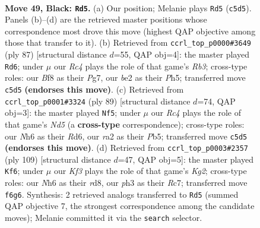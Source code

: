 \documentclass[11pt]{article}
\begin{document}
\clearpage

\begin{figure}[p]\centering
\begin{subfigure}{0.46\textwidth}\centering
\resizebox{\linewidth}{!}{%
\newchessgame
\chessboard[
  setfen={5b1r/p6p/P4k1n/2r5/8/1Pp3BP/R1P1B1PK/2R5 b - - 6 49},
  showmover=false,
  pgfstyle=straightmove, color=movearrow, markmove={c5-d5}
]}
\caption{}
\end{subfigure}\hfill
\begin{subfigure}{0.46\textwidth}\centering
\resizebox{\linewidth}{!}{%
\newchessgame
\chessboard[
  setfen={5k2/6p1/pr6/1p1B1p1p/3P4/bP4P1/P1R2PK1/8 b - - 1 44},
  showmover=false,
  pgfstyle=straightmove, color=movearrow, markmove={b6-d6}
]}
\caption{}
\end{subfigure}
\\[4pt]
\begin{subfigure}{0.46\textwidth}\centering
\resizebox{\linewidth}{!}{%
\newchessgame
\chessboard[
  setfen={5k2/6b1/p2r4/1p6/3n1P1P/P5PK/BP4R1/8 b - - 4 45},
  showmover=false,
  pgfstyle=straightmove, color=movearrow, markmove={d4-f5}
]}
\caption{}
\end{subfigure}\hfill
\begin{subfigure}{0.46\textwidth}\centering
\resizebox{\linewidth}{!}{%
\newchessgame
\chessboard[
  setfen={3R4/2r1p1k1/6p1/2n4p/p1P2P1P/5KP1/P1R1B3/1r6 b - - 32 55},
  showmover=false,
  pgfstyle=straightmove, color=movearrow, markmove={g7-f6}
]}
\caption{}
\end{subfigure}
\caption{\textbf{Move 49, Black: \texttt{Rd5}.} (a) Our position; Melanie plays \texttt{Rd5} (\texttt{c5d5}). Panels (b)--(d) are the retrieved master positions whose correspondence most drove this move (highest QAP objective among those that transfer to it). (b) Retrieved from \texttt{ccrl\_top\_p0000\#3649} (ply 87) [structural distance $d$=55, QAP obj=4]: the master played \texttt{Rd6}; under $\mu$ our \emph{Rc4} plays the role of that game's \emph{Rb3}; cross-type roles: our \emph{B}f8 as their \emph{P}g7, our \emph{b}e2 as their \emph{P}h5; transferred move \texttt{c5d5} \textbf{(endorses this move)}. (c) Retrieved from \texttt{ccrl\_top\_p0001\#3324} (ply 89) [structural distance $d$=74, QAP obj=3]: the master played \texttt{Nf5}; under $\mu$ our \emph{Rc4} plays the role of that game's \emph{Nd5} (a \textbf{cross-type} correspondence); cross-type roles: our \emph{N}h6 as their \emph{R}d6, our \emph{r}a2 as their \emph{P}b5; transferred move \texttt{c5d5} \textbf{(endorses this move)}. (d) Retrieved from \texttt{ccrl\_top\_p0003\#2357} (ply 109) [structural distance $d$=47, QAP obj=5]: the master played \texttt{Kf6}; under $\mu$ our \emph{Kf3} plays the role of that game's \emph{Kg2}; cross-type roles: our \emph{N}h6 as their \emph{r}d8, our \emph{p}h3 as their \emph{R}c7; transferred move \texttt{f6g6}. Synthesis: 2 retrieved analogs transferred to \texttt{Rd5} (summed QAP objective 7, the strongest correspondence among the candidate moves); Melanie committed it via the \texttt{search} selector.}
\label{fig:thought-m97}
\end{figure}
\end{document}
